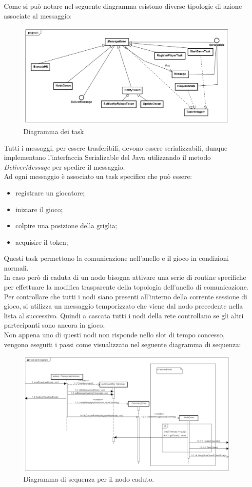 \documentclass{llncs}
\begin{document}
Come si può notare nel seguente diagramma esistono diverse tipologie di azione associate al messaggio:
\begin{figure}[H]
\centering
    \includegraphics[width=12cm]{imgs/Task-diagram.png}
     \caption{Diagramma dei task}
   \label{output:blacknoxis_normal}
\end{figure}
Tutti i messaggi, per essere trasferibili, devono essere serializzabili, dunque implementano l'interfaccia Serializable del Java utilizzando il metodo \emph{DeliverMessage} per spedire il messaggio.\\
Ad ogni messaggio è associato un task specifico che può essere:
\begin{itemize}
	\item registrare un giocatore;
	\item iniziare il gioco;
	\item colpire una posizione della griglia;
	\item acquisire il token;
\end{itemize}
Questi task permettono la comunicazione nell'anello e il gioco in condizioni normali.\\
In caso però di caduta di un nodo bisogna attivare una serie di routine specifiche per effettuare la modifica trasparente della topologia dell'anello di comunicazione.\\
Per controllare che tutti i nodi siano presenti all'interno della corrente sessione di gioco, si utilizza un messaggio temporizzato che viene dal nodo precedente nella lista al successivo. Quindi a cascata tutti i nodi della rete controllano se gli altri partecipanti sono ancora in gioco.\\
Non appena uno di questi nodi non risponde nello slot di tempo concesso, vengono eseguiti i passi come visualizzato nel seguente diagramma di sequenza:
\begin{figure}[H]
\centering
    \includegraphics[width=12cm]{imgs/Node-down-diagram.png}
     \caption{Diagramma di sequenza per il nodo caduto.}
   \label{output:blacknoxis_normal}
\end{figure}
\end{document}
